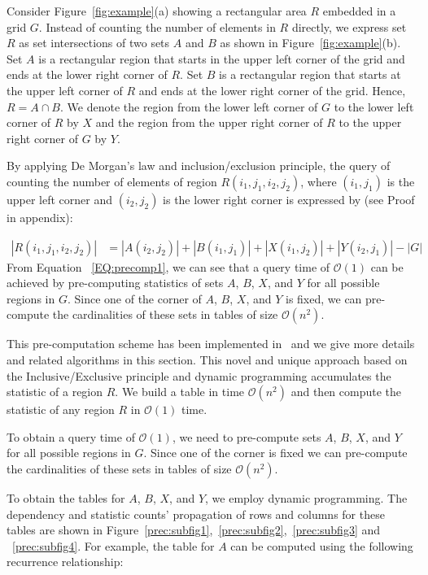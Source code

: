 \documentclass[AMA,LATO1COL]{WileyNJD-v2}
\newcommand\bigo{\mathcal O}
\begin{document}
Consider Figure~\ref{fig:example}(a) showing a rectangular area $R$
embedded in a grid $G$. Instead of counting the number of elements in
$R$ directly, we express set $R$ as set intersections of two sets $A$
and $B$ as shown in Figure~\ref{fig:example}(b). Set $A$ is a
rectangular region that starts in the upper left corner of the grid
and ends at the lower right corner of $R$. Set $B$ is a rectangular
region that starts at the upper left corner of $R$ and ends at the
lower right corner of the grid. Hence, $R=A \cap B$. We denote the
region from the lower left corner of $G$ to the lower left corner of
$R$ by $X$ and the region from the upper right corner of $R$ to the
upper right corner of $G$ by $Y$.

By applying De Morgan's law and inclusion/exclusion principle, the
query of counting the number of elements of region
$R(i_1,j_1,i_2,j_2)$, where $(i_1,j_1)$ is the upper left corner and
$(i_2,j_2)$ is the lower right corner is expressed by (see Proof in
appendix):


\begin{equation}
\label{EQ:precomp1}
\begin{split}
|R(i_1,j_1,i_2,j_2)|& = |A(i_2,j_2)| + |B(i_1,j_1)| + |X(i_1,j_2)|  + |Y(i_2,j_1)| - |G|
\end{split}
\end{equation}
\normalsize From Equation ~\ref{EQ:precomp1}, we can see that a query
time of $\bigo(1)$ can be achieved by pre-computing statistics of sets
$A$, $B$, $X$, and $Y$ for all possible regions in $G$. Since one of
the corner of $A$, $B$, $X$, and $Y$ is fixed, we can pre-compute the
cardinalities of these sets in tables of size $\bigo(n^2)$.

This pre-computation scheme has been implemented in~\cite{apweb} and
we give more details and related algorithms in this section. This novel and unique approach based on the Inclusive/Exclusive principle and
dynamic programming accumulates the statistic of a region $R$. We build a table in time $\bigo(n^2)$ and then compute the statistic of any region $R$ in $\bigo(1)$ time.

To obtain a query time of $\bigo(1)$, we need to pre-compute sets $A$, $B$, $X$, and $Y$ for all possible regions in $G$. Since one of the corner is fixed we can pre-compute the cardinalities of these sets in tables of size $\bigo(n^2)$.

To obtain the tables for $A$, $B$, $X$, and $Y$, we employ dynamic programming. The dependency and statistic counts' propagation of rows and columns for these tables are shown in Figure~\ref{prec:subfig1},~\ref{prec:subfig2},~\ref{prec:subfig3} and ~\ref{prec:subfig4}. For example, the table for $A$ can be computed using the following recurrence relationship:
\end{document}

